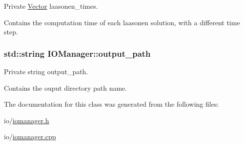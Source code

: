 Private \hyperlink{classVector}{Vector} laasonen\+\_\+times. 

Contains the computation time of each laasonen solution, with a different time step. 
\subsubsection[{\texorpdfstring{output\+\_\+path}{output_path}}]{\setlength{\rightskip}{0pt plus 5cm}std\+::string I\+O\+Manager\+::output\+\_\+path\hspace{0.3cm}{\ttfamily [private]}}\hypertarget{classIOManager_a6af8948f7b74b4d6187baca2719cf8dc}{}\label{classIOManager_a6af8948f7b74b4d6187baca2719cf8dc}


Private string output\+\_\+path. 

Contains the ouput directory path name. 

The documentation for this class was generated from the following files\+:\begin{DoxyCompactItemize}
\item 
io/\hyperlink{iomanager_8h}{iomanager.\+h}\item 
io/\hyperlink{iomanager_8cpp}{iomanager.\+cpp}\end{DoxyCompactItemize}
